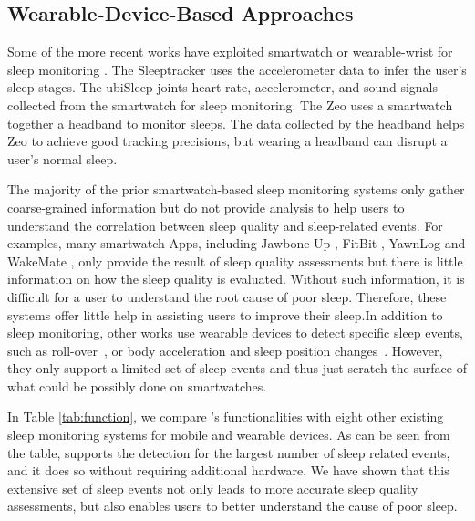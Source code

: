 \subsection{Wearable-Device-Based Approaches}
Some of the more recent works have exploited smartwatch or wearable-wrist for sleep
 monitoring \cite{bain2003evaluation,bonnet2003insomnia,pombo2016ubisleep,caviness1996myoclonus}. The Sleeptracker \cite{sleeptracker} uses
 the accelerometer data to infer the user's sleep stages. The ubiSleep \cite{pombo2016ubisleep} joints heart rate, accelerometer, and sound signals collected from the smartwatch for
 sleep monitoring. The Zeo \cite{caviness1996myoclonus} uses a smartwatch together a headband to monitor sleeps. The data collected by the
 headband helps Zeo to achieve good tracking precisions, but wearing a headband can disrupt a user's normal sleep.

The majority of the prior smartwatch-based sleep monitoring systems only gather coarse-grained information but do not provide analysis to
help users to understand the correlation between sleep quality and sleep-related events. For examples, many smartwatch Apps, including
Jawbone Up \cite{Jawbone}, FitBit \cite{fitbit}, YawnLog \cite{YawnLog} and WakeMate \cite{WakeMate}, only provide the result of sleep
quality assessments but there is little information on how the sleep quality is evaluated. Without such information, it is difficult for a
user to understand the root cause of poor sleep. Therefore, these systems offer little help in assisting users to improve their sleep.In
addition to sleep monitoring, other works use wearable devices to detect specific sleep events, such as roll-over~\cite{wear_related2}, or
body acceleration and sleep position changes~\cite{wear_related3}. However, they only support a limited set of sleep events and thus just
scratch the surface of what could be possibly done on smartwatches.



In Table \ref{tab:function}, we compare {\systemname}'s functionalities with eight other existing sleep monitoring systems for mobile and
wearable devices. As can be seen from the table, {\systemname} supports the detection for the largest number of sleep related events, and
it does so without requiring additional hardware. We have shown that this extensive set of sleep events not only leads to more accurate
sleep quality assessments, but also enables users to better understand the cause of poor sleep.



